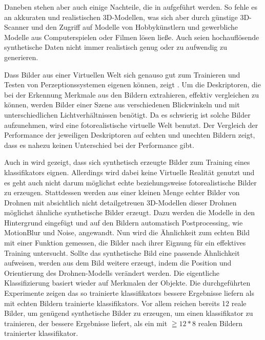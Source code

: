Daneben stehen aber auch einige Nachteile, die in \cite{heisele} aufgeführt werden. So fehle es an akkuraten und realistischen 3D-Modellen, was sich aber durch günstige 3D-Scanner und den Zugriff auf Modelle von Hobbykünstlern und gewerbliche Modelle aus Computerspielen oder Filmen lösen ließe. Auch seien hochauflösende synthetische Daten nicht immer realistisch genug oder zu aufwendig zu generieren.  \par

Dass Bilder aus einer Virtuellen Welt sich genauso gut zum Trainieren und Testen von Perzeptionssystemen eigenen können, zeigt \cite{kaneva}. Um die Deskriptoren, die bei der Erkennung Merkmale aus den Bildern extrahieren, effektiv vergleichen zu können, werden Bilder einer Szene aus verschiedenen Blickwinkeln und mit unterschiedlichen Lichtverhältnissen benötigt. Da es schwierig ist solche Bilder aufzunehmen, wird eine fotorealistische virtuelle Welt benutzt. Der Vergleich der Performance der jeweiligen Deskriptoren auf echten und unechten Bildern zeigt, dass es nahezu keinen Unterschied bei der Performance gibt. \par 

Auch in \cite{synthImg} wird gezeigt, dass sich synthetisch erzeugte Bilder zum Training eines \gls{klassifikator}s eignen. Allerdings wird dabei keine Virtuelle Realität genutzt und es geht auch nicht darum möglichst echte beziehungsweise fotorealistische Bilder zu erzeugen.   Stattdessen werden aus einer kleinen Menge echter Bilder von Drohnen mit absichtlich nicht detailgetreuen 3D-Modellen dieser Drohnen möglichst ähnliche synthetische Bilder erzeugt. Dazu werden die Modelle in den Hintergrund eingefügt und auf den Bildern automatisch Postprocessing, wie MotionBlur und Noise, angewandt. Nun wird die Ähnlichkeit zum echten Bild  mit einer Funktion gemessen, die Bilder nach ihrer Eignung für ein effektives Training untersucht. Sollte das synthetische Bild eine passende Ähnlichkeit aufweisen, werden aus dem Bild weitere erzeugt, indem die Position und Orientierung des Drohnen-Modells verändert werden. Die eigentliche Klassifizierung basiert wieder auf Merkmalen der Objekte. Die durchgeführten Experimente zeigen das so trainierte \glspl{klassifikator} bessere Ergebnisse liefern als mit echten Bildern trainierte \glspl{klassifikator}. Vor allem reichen bereits 12 reale Bilder, um genügend synthetische Bilder zu erzeugen, um einen \gls{klassifikator} zu trainieren, der bessere Ergebnisse liefert, als ein mit $\geqq 12 * 8$ realen Bildern trainierter \gls{klassifikator}. \par   

